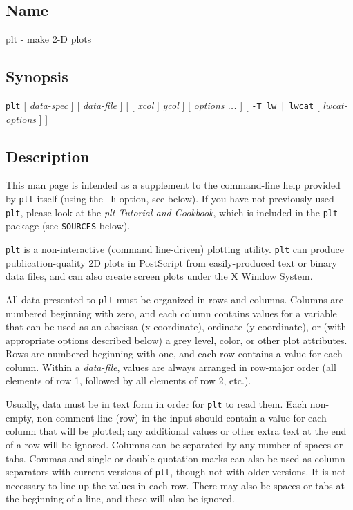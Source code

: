 \subsection*{Name}
plt - make 2-D plots 
\subsection*{Synopsis}
\texttt{plt} [ \textit{data-spec} ] [ \textit{data-file} ] [ [ \textit{xcol} ]
\textit{ycol} ] [ \textit{options ...} ] [ \texttt{-T lw $|$ lwcat} [ \textit{lwcat-options} ] ] 
\subsection*{Description}


This man
page is intended as a supplement to the command-line help provided by \texttt{plt}
itself (using the \texttt{-h} option, see below).  If you have not previously used
\texttt{plt}, please look at the \textit{plt Tutorial and Cookbook}, which is included in
the \texttt{plt} package (see \texttt{SOURCES} below). 

\texttt{plt} is a non-interactive (command line-driven)
plotting utility. \texttt{plt} can produce publication-quality 2D plots in PostScript
from easily-produced text or binary data files, and can also create screen
plots under the X Window System. 

All data presented to \texttt{plt} must be organized
in rows and columns. Columns are numbered beginning with zero, and each
column contains values for a variable that can be used as an abscissa (x
coordinate), ordinate (y coordinate), or (with appropriate options described
below) a grey level, color, or other plot attributes.  Rows are numbered
beginning with one, and each row contains a value for each column. Within
a \textit{data-file}, values are always arranged in row-major order (all elements
of row 1, followed by all elements of row 2, etc.). 

Usually, data must be
in text form in order for \texttt{plt} to read them. Each non-empty, non-comment line
(row) in the input should contain a value for each column that will be
plotted; any additional values or other extra text at the end of a row
will be ignored. Columns can be separated by any number of spaces or tabs.
 Commas and single or double quotation marks can also be used as column
separators with current versions of \texttt{plt}, though not with older versions.
It is not necessary to line up the values in each row.  There may also be
spaces or tabs at the beginning of a line, and these will also be ignored.


